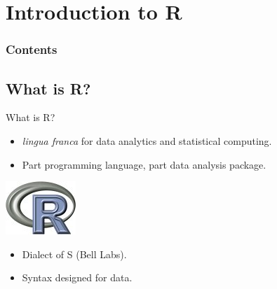 \section[Intro to R]{Introduction to R}

\hidenum
\begin{frame}[noframenumbering]
\frametitle{Contents}
 \tableofcontents[currentsection,hideothersubsections,sectionstyle=show/hide]
\end{frame}
\shownum

\subsection{What is R?}


\begin{frame}
  \begin{block}{What is R?}\pause
  \begin{minipage}{.75\textwidth}
  \begin{itemize}[<+-|alert@+>]
    \item \emph{lingua franca} for data analytics and statistical computing.
    \item Part programming language, part data analysis package.
  \end{itemize}
  \end{minipage}
  \hfill
  \begin{minipage}{.2\textwidth}
    \centering\includegraphics[scale=2]{../common/pics/Rlogo}
  \end{minipage}
  \begin{itemize}
    \item Dialect of S (Bell Labs).
    \item Syntax designed for data.
  \end{itemize}
\end{block}
\end{frame}


